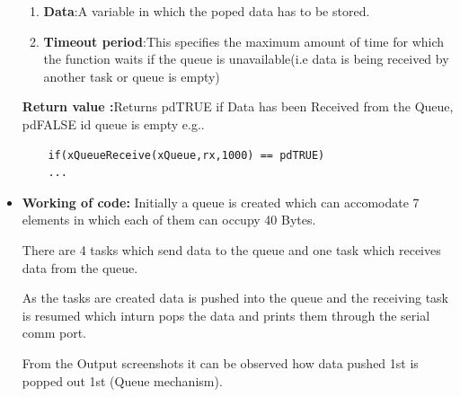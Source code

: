\documentclass[11pt,a4paper]{book}
\begin{document}
\begin{itemize}
\begin{enumerate}
		\item\textbf{Data}:A variable in which the poped data has to be stored.
		
		\item\textbf{Timeout period}:This specifies the maximum amount of time for which the function waits if the queue is unavailable(i.e data is being received by another task or queue is empty) 
		\newline		
	\end{enumerate}
	\textbf{Return value :}Returns pdTRUE if Data has been Received from the Queue, pdFALSE id queue is empty e.g..
	\begin{lstlisting}
	if(xQueueReceive(xQueue,rx,1000) == pdTRUE)
	...
	\end{lstlisting}
	
	\item\textbf{Working of code:}
	Initially a queue is created which can accomodate 7 elements in which each of them can occupy 40 Bytes.
	
	There are 4 tasks which send data to the queue and one task which receives data from the queue.
	
	As the tasks are created data is pushed into the queue and the receiving task is resumed which inturn pops the data and prints them through the serial comm port.
	
	From the Output screenshots it can be observed how  data pushed 1st is popped out 1st (Queue mechanism).  
	\end{itemize}
\end{document}
